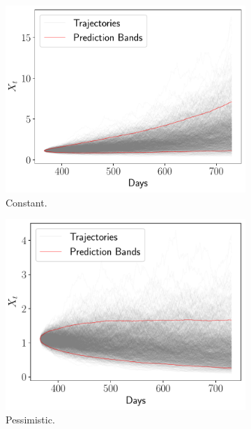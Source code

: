 \documentclass[11pt]{article}
\theoremstyle{definition}
\theoremstyle{remark}
\theoremstyle{remark}
\begin{document}
\begin{figure}[H]
  \centering
  \begin{subfigure}[b]{0.45\textwidth}
      \centering
      \includegraphics[scale=0.45]{bands_constant.pdf}
      \caption{Constant.}
  \end{subfigure}
  \begin{subfigure}[b]{0.45\textwidth}
      \centering
      \includegraphics[scale=0.45]{bands_pessimistic.pdf}
      \caption{Pessimistic.}
  \end{subfigure}
  \begin{subfigure}[b]{0.45\textwidth}
      \centering

\end{subfigure}
\end{figure}
\end{document}
